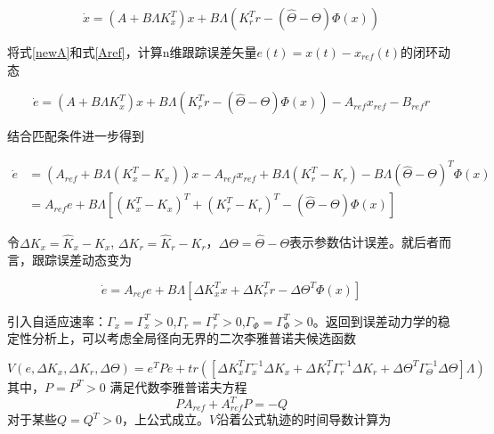 \begin{equation}
\label{newA}
\dot x = (A + B\Lambda K_x^T)x + B\Lambda \left( {K_r^Tr - (\hat \Theta  - \Theta )\Phi \left( x \right)} \right)
\end{equation}

将式\ref{newA}和式\ref{Aref}，计算n维跟踪误差矢量$e(t)=x(t)-x_{ref}(t)$的闭环动态

\begin{equation}
\dot e = \left( {A + B\Lambda K_x^T} \right)x + B\Lambda \left( {K_r^Tr - (\hat \Theta  - \Theta )\Phi \left( x \right)} \right) - {A_{ref}}{x_{ref}} - {B_{ref}}r
\end{equation}

结合匹配条件进一步得到

\begin{equation}
\begin{split}
 \dot{e} &= \left( {{A_{ref}} + B\Lambda \left( {K_x^T - {K_x}} \right)} \right)x - {A_{ref}}{x_{ref}} + B\Lambda \left( {K_r^T - {K_r}} \right) - B\Lambda {\left( {\hat \Theta  - \Theta } \right)^T}\Phi \left( x \right) \\
        &= {A_{ref}}e + B\Lambda \left[ {{{\left( {K_x^T - {K_x}} \right)}^T} + {{\left( {K_r^T - {K_r}} \right)}^T} - \left( {\hat \Theta  - \Theta } \right)\Phi \left( x \right)} \right]
\end{split}
\end{equation}

令$\Delta {K_x} = {{\hat K}_x} - {K_x}$, $\Delta {K_r} = {{\hat K}_r} - {K_r}$，$\Delta {\Theta} = {{\hat \Theta}} - {\Theta}$表示参数估计误差。就后者而言，跟踪误差动态变为


\begin{equation}
\dot{e}= A_{ref}e + B \Lambda\left[\Delta K_x^T x + \Delta K_r^T r - \Delta \Theta^T \Phi(x)\right]
\end{equation}

引入自适应速率：${\Gamma _x = \Gamma _x^T} > 0$,$\Gamma _r = \Gamma _r^T>0$,$\Gamma _{\Phi} = \Gamma _{\Phi}^T > 0$。返回到误差动力学的稳定性分析上，可以考虑全局径向无界的二次李雅普诺夫候选函数

\begin{equation}
V\left( e, \Delta K_x, \Delta K_r, \Delta
\Theta \right) =e^TPe +tr\left( \left[\Delta K_x^T \Gamma_x^{-1} \Delta K_x + \Delta K_r^T \Gamma_r ^{-1} \Delta K_r + \Delta \Theta^T \Gamma _{\Theta}^{-1} \Delta \Theta \right]\Lambda \right)
\end{equation}
其中，$P = P^T>0 $ 满足代数李雅普诺夫方程
\begin{equation}
PA_{ref} + A_{ref}^T P = -Q
\end{equation}
对于某些$Q=Q^T>0$，上公式成立。$V$沿着公式轨迹的时间导数计算为

